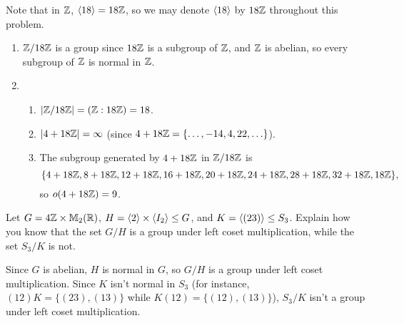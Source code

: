 \begin{solution}[print=false]
Note that in $\mathbb{Z}$, $\langle18\rangle=18\mathbb{Z}$, so we may denote $\langle18\rangle$ by $18\mathbb{Z}$ throughout this problem.

\begin{enumerate}
\item $\mathbb{Z}/18\mathbb{Z}$ is a group since $18\mathbb{Z}$ is a subgroup of $\mathbb{Z}$, and $\mathbb{Z}$ is abelian, so every subgroup of $\mathbb{Z}$ is normal in $\mathbb{Z}$.
\item

\begin{enumerate}
\item $|\mathbb{Z}/18\mathbb{Z}|=(\mathbb{Z}:18\mathbb{Z})=18$.
\item $|4+18\mathbb{Z}|=\infty$ (since $4+18\mathbb{Z}=\{\ldots, -14, 4, 22,\ldots\}$).
\item The subgroup generated by $4+18\mathbb{Z}$ in $\mathbb{Z}/18\mathbb{Z}$ is
$$\{4+18\mathbb{Z}, 8+18\mathbb{Z}, 12+18\mathbb{Z}, 16+18\mathbb{Z}, 20+18\mathbb{Z}, 24+18\mathbb{Z}, 28+18\mathbb{Z}, 32+18\mathbb{Z}, 18\mathbb{Z}\},$$ so $o(4+18\mathbb{Z})=9$.
\end{enumerate}
\end{enumerate}

\end{solution}

\begin{comment}
\begin{exercise}
Find the order of some $(\Z_n \times \Z_m )/\<(a,b)\>$.
\end{exercise}
\end{comment}

\begin{exercise} Let $G=4\mathbb{Z} \times \mathbb{M}_2(\mathbb{R})$, $H=\langle2\rangle\times \langle I_2\rangle \leq G$, and $K=\langle(23)\rangle\leq S_3$.
Explain how you know that the set $G/H$ is a group under left coset multiplication, while the set $S_3/K$ is not.
\end{exercise}

\begin{solution}[print=false]

Since $G$ is abelian, $H$ is normal in $G$, so $G/H$ is a group under left coset multiplication.  Since $K$ isn't normal in $S_3$ (for instance, $(12)K=\{(23),(13)\}$ while $K(12)=\{(12),(13)\}$), $S_3/K$ isn't a group under left coset multiplication.
\end{solution}

